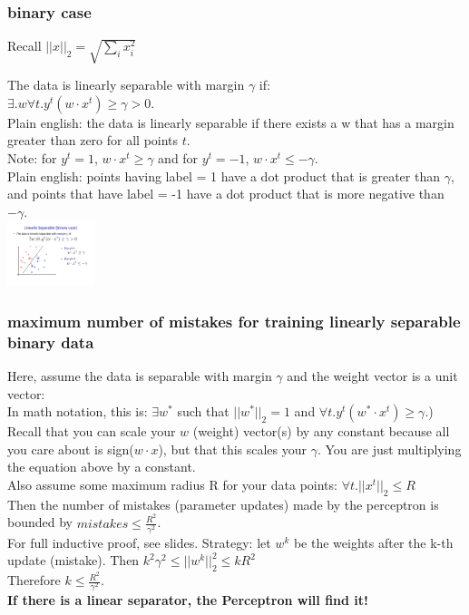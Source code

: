  \subsubsection{binary case}
Recall $ \displaystyle  ||x||_2 = \sqrt{\sum_i x_i^2}$ 
 
 The data is linearly separable with margin $\gamma$ if:   \hfill \\
$\exists .w \forall t . y^t (w \cdot x^t) \geq \gamma > 0$.  \hfill \\
Plain english: the data is linearly separable if there exists a w that has a margin greater than zero for all points $t$.  \hfill \\
Note: for $y^t = 1$, $w \cdot x^t \geq \gamma$ and for $y^t = -1$, $w \cdot x^t \leq -\gamma$.  \hfill \\
Plain english: points having label = 1 have a dot product that is greater than $\gamma$, and points that have label = -1 have a dot product that is more negative than $-\gamma$.  \hfill \\
 \includegraphics[width=1.0in]{figures/lin_sep_margin.pdf}
 
 \subsubsection{maximum number of mistakes for training linearly separable binary data}
Here, assume the data is separable with margin $\gamma$ and the weight vector is a unit vector: \hfill \\
In math notation, this is: $\exists w^*$ such that $||w^*||_2 = 1$ and $\forall t. y^t(w^* \cdot x^t) \geq \gamma$.) \hfill \\
Recall that you can scale your $w$ (weight) vector(s) by any constant because all you care about is sign($w \cdot x$),
but that this scales your $\gamma$.  You are just multiplying the equation above by a constant.  \hfill \\

Also assume some maximum radius R for your data points:  
$\forall t. ||x^t||_2 \leq R$ \hfill \\
Then the number of mistakes (parameter updates) made by the perceptron is bounded by 
$\displaystyle mistakes \leq \frac{R^2}{\gamma^2}$. \hfill \\
For full inductive proof, see slides.  
Strategy: let $w^k$ be the weights after the k-th update (mistake).  
Then $k^2 \gamma^2 \leq ||w^k||_2^2 \leq k R^2$ \hfill \\
Therefore $k \leq \frac{R^2}{\gamma^2}$.  \hfill \\
\textbf{If there is a linear separator, the Perceptron will find it!}
		
